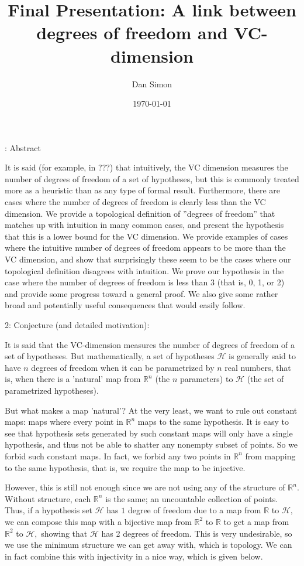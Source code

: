 \documentclass{article}
\title{Final Presentation: A link between degrees of freedom and VC-dimension}
\author{Dan Simon}
\date{\today}
\begin{document}
: Abstract

It is said (for example, in ???) that intuitively, the VC dimension measures the number of degrees of freedom of a set of hypotheses, but this is commonly treated more as a heuristic than as any type of formal result. Furthermore, there are cases where the number of degrees of freedom is clearly less than the VC dimension. We provide a topological definition of ''degrees of freedom'' that matches up with intuition in many common cases, and present the hypothesis that this is a lower bound for the VC dimension. We provide examples of cases where the intuitive number of degrees of freedom appears to be more than the VC dimension, and show that surprisingly these seem to be the cases where our topological definition disagrees with intuition. We prove our hypothesis in the case where the number of degrees of freedom is less than 3 (that is, 0, 1, or 2) and provide some progress toward a general proof. We also give some rather broad and potentially useful consequences that would easily follow.

2: Conjecture (and detailed motivation):

It is said that the VC-dimension measures the number of degrees of freedom of a set of hypotheses. But mathematically, a set of hypotheses $\mathcal{H}$ is generally said to have $n$ degrees of freedom when it can be parametrized by $n$ real numbers, that is, when there is a 'natural' map from $\mathbb{R}^n$ (the $n$ parameters) to $\mathcal{H}$ (the set of parametrized hypotheses).

But what makes a map 'natural'? At the very least, we want to rule out constant maps: maps where every point in $\mathbb{R}^n$ maps to the same hypothesis. It is easy to see that hypothesis sets generated by such constant maps will only have a single hypothesis, and thus not be able to shatter any nonempty subset of points. So we forbid such constant maps. In fact, we forbid any two points in $\mathbb{R}^n$ from mapping to the same hypothesis, that is, we require the map to be injective.

However, this is still not enough since we are not using any of the structure of $\mathbb{R}^n.$ Without structure, each $\mathbb{R}^n$ is the same; an uncountable collection of points. Thus, if a hypothesis set $\mathcal{H}$ has $1$ degree of freedom due to a map from $\mathbb{R}$ to $\mathcal{H},$ we can compose this map with a bijective map from $\mathbb{R}^2$ to $\mathbb{R}$ to get a map from $\mathbb{R}^2$ to $\mathcal{H},$ showing that $\mathcal{H}$ has 2 degrees of freedom. This is very undesirable, so we use the minimum structure we can get away with, which is topology. We can in fact combine this with injectivity in a nice way, which is given below.
\end{document}
